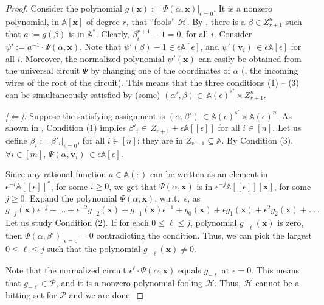 \documentclass{toc}
\newcommand{\calH}{\mathcal{H}}
\newcommand{\calP}{\mathcal{P}}
\newcommand{\aff}{\mathbb{A}}
\begin{document}
\begin{proof}
Consider the polynomial $g(\mathbf x):= \Psi(\alpha, \mathbf x)\big\vert_{\epsilon=0}$. It is a nonzero polynomial, in $\aff[\mathbf x]$ of 
%
degree $r$, %
that ``fools'' $\calH$. By 
%
, %
there is a $\beta\in Z_{r+1}^n$ such that $a:= g(\beta)$ is in $\aff^*$. Clearly, $\beta_i^{r+1} - 1 = 0$, for all $i$. Consider $\psi':= a^{-1}\cdot\Psi(\alpha, \mathbf x)$. Note that $\psi'(\beta)-1 \in \epsilon\aff[\epsilon]$, and $\psi'(\mathbf{v}_i) \,\in \epsilon\aff[\epsilon]$ for all $i$. Moreover, the normalized polynomial $\psi'(\mathbf x)$ can easily be obtained from the universal circuit $\Psi$ by changing one of the coordinates of $\alpha$ (\eg, the incoming wires of the root of the circuit). This means that the three conditions 
%
(1) -- (3) %
can be simultaneously satisfied by (some) $(\alpha',\beta)\in\, \aff(\epsilon)^{s'}\times Z_{r+1}^n$.

\smallskip\emph{[$\Leftarrow$]:}
Suppose the satisfying assignment is $(\alpha, \beta')\,\in \aff(\epsilon)^{s'}\times \aff(\epsilon)^{n}$. As shown in , 
%
Condition (1) implies %
$\beta'_i\in \, Z_{r+1} + \epsilon\aff[[\epsilon]]$ for all $i\in[n]$. Let us define $\beta_i:= \beta'_i\big\vert_{\epsilon=0}$, for all $i\in[n]$; they are in $Z_{r+1}\subseteq\aff$. 
%
By Condition (3), %
$\forall i \in [m],\, \Psi(\alpha,\mathbf{v}_i) \,\in \epsilon\aff[\epsilon]$.

Since any rational function $a\in \aff(\epsilon)$ can be written as an element in $\epsilon^{-i}\aff[[\epsilon]]^*$, for some $i\ge0$, we get that $\Psi(\alpha,\mathbf x)$ is in 
$\epsilon^{-j}\aff[[\epsilon]][\mathbf x]$, for some $j\ge0$.
Expand the polynomial $\Psi(\alpha,\mathbf x)$, w.r.t.\ $\epsilon$, 
%
as %
$$g_{-j}(\mathbf x)\epsilon^{-j} + \dots + \epsilon^{-2} g_{-2}(\mathbf x) + g_{-1}(\mathbf x)\epsilon^{-1} + g_0(\mathbf x) + \epsilon g_1(\mathbf x) + \epsilon^2 g_2(\mathbf x) + \dots \,.$$
%
Let us study Condition (2). If for each $0\le\ell\le j$, polynomial $g_{-\ell}(\mathbf x)$ is zero, then $\Psi(\alpha,\beta')\big\vert_{\epsilon=0} =0$ contradicting the condition. Thus, we can pick the largest $0\le\ell\le j$ such that the polynomial $g_{-\ell}(\mathbf x)\ne0$. %
%

Note that the normalized circuit $\epsilon^\ell\cdot \Psi(\alpha,\mathbf x)$ equals $g_{-\ell}$ at $\epsilon=0$. This means that $g_{-\ell}\in\calP$, and it is a nonzero polynomial fooling $\calH$. Thus, $\calH$ cannot be a hitting set for $\calP$ and we are done.
\end{proof}
\end{document}

